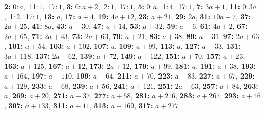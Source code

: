 \textsf{\bfseries 2:} 0:\,$a$,\ 11:\,$1$,\ 17:\,$1$, \textsf{\bfseries 3:} 0:\,$a + 2$,\ 2:\,$1$,\ 17:\,$1$, \textsf{\bfseries 5:} 0:\,$a$,\ 1:\,$4$,\ 17:\,$1$, \textsf{\bfseries 7:} $3a + 1$, \textsf{\bfseries 11:} 0:\,$3a$,\ 1:\,$2$,\ 17:\,$1$, \textsf{\bfseries 13:} $a$, \textsf{\bfseries 17:} $a + 4$, \textsf{\bfseries 19:} $4a + 12$, \textsf{\bfseries 23:} $a + 21$, \textsf{\bfseries 29:} $2a$, \textsf{\bfseries 31:} $10a + 7$, \textsf{\bfseries 37:} $2a + 25$, \textsf{\bfseries 41:} $8a$, \textsf{\bfseries 43:} $a + 30$, \textsf{\bfseries 47:} $a + 14$, \textsf{\bfseries 53:} $a + 32$, \textsf{\bfseries 59:} $a + 6$, \textsf{\bfseries 61:} $4a + 2$, \textsf{\bfseries 67:} $2a + 65$, \textsf{\bfseries 71:} $2a + 43$, \textsf{\bfseries 73:} $2a + 63$, \textsf{\bfseries 79:} $a + 21$, \textsf{\bfseries 83:} $a + 38$, \textsf{\bfseries 89:} $a + 31$, \textsf{\bfseries 97:} $2a + 63$, \textsf{\bfseries 101:} $a + 54$, \textsf{\bfseries 103:} $a + 102$, \textsf{\bfseries 107:} $a$, \textsf{\bfseries 109:} $a + 99$, \textsf{\bfseries 113:} $a$, \textsf{\bfseries 127:} $a + 33$, \textsf{\bfseries 131:} $3a + 118$, \textsf{\bfseries 137:} $2a + 62$, \textsf{\bfseries 139:} $a + 72$, \textsf{\bfseries 149:} $a + 122$, \textsf{\bfseries 151:} $a + 70$, \textsf{\bfseries 157:} $a + 23$, \textsf{\bfseries 163:} $a + 125$, \textsf{\bfseries 167:} $a + 12$, \textsf{\bfseries 173:} $2a + 12$, \textsf{\bfseries 179:} $a + 99$, \textsf{\bfseries 181:} $a$, \textsf{\bfseries 191:} $a + 38$, \textsf{\bfseries 193:} $a + 164$, \textsf{\bfseries 197:} $a + 110$, \textsf{\bfseries 199:} $a + 64$, \textsf{\bfseries 211:} $a + 70$, \textsf{\bfseries 223:} $a + 83$, \textsf{\bfseries 227:} $a + 67$, \textsf{\bfseries 229:} $a + 129$, \textsf{\bfseries 233:} $a + 68$, \textsf{\bfseries 239:} $a + 56$, \textsf{\bfseries 241:} $a + 121$, \textsf{\bfseries 251:} $2a + 63$, \textsf{\bfseries 257:} $a + 84$, \textsf{\bfseries 263:} $a$, \textsf{\bfseries 269:} $a + 20$, \textsf{\bfseries 271:} $a + 37$, \textsf{\bfseries 277:} $a + 58$, \textsf{\bfseries 281:} $a + 216$, \textsf{\bfseries 283:} $a + 267$, \textsf{\bfseries 293:} $a + 46$, \textsf{\bfseries 307:} $a + 133$, \textsf{\bfseries 311:} $a + 11$, \textsf{\bfseries 313:} $a + 169$, \textsf{\bfseries 317:} $a + 277$